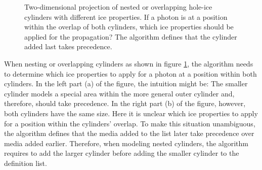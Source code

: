 \begin{figure}[htbp]
  \hfill
  \caption{Two-dimensional projection of nested or overlapping hole-ice cylinders with different ice properties. If a photon is at a position within the overlap of both cylinders, which ice properties should be applied for the propagation? The algorithm defines that the cylinder added last takes precedence.}
  \label{fig:kuZ8deek}
\end{figure}

When nesting or overlapping cylinders as shown in figure
\ref{fig:kuZ8deek}, the algorithm needs to determine which ice
properties to apply for a photon at a position within both cylinders. In
the left part (a) of the figure, the intuition might be: The smaller
cylinder models a special area within the more general outer cylinder
and, therefore, should take precedence. In the right part (b) of the
figure, however, both cylinders have the same size. Here it is unclear
which ice properties to apply for a position within the cylinders'
overlap. To make this situation unambiguous, the algorithm defines that
the media added to the list later take precedence over media added
earlier. Therefore, when modeling nested cylinders, the algorithm
requires to add the larger cylinder before adding the smaller cylinder
to the definition list.

